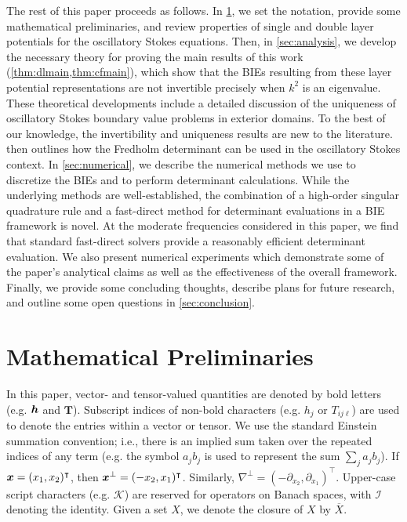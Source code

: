 The rest of this paper proceeds as follows.
%
In \cref{sec:prelim}, we set the notation, provide some
mathematical preliminaries, and review 
properties of single and double layer potentials
for the oscillatory Stokes equations.
%
Then, in \cref{sec:analysis}, we develop the necessary
theory for proving the main results of this work 
(\cref{thm:dlmain,thm:cfmain}),
which show that the BIEs resulting from these
layer potential representations are not invertible
precisely when $k^2$ is an eigenvalue.
%
These theoretical developments include a detailed
discussion of the uniqueness of oscillatory Stokes
boundary value problems in exterior domains.
%
To the best of our knowledge, the invertibility
and uniqueness results are new to the literature.
%
 then outlines how the Fredholm determinant
can be used in the oscillatory Stokes context.
%
In \cref{sec:numerical}, we describe the numerical
methods we use to discretize the BIEs and to perform
determinant calculations.
%
While the underlying methods are well-established,
the combination of a high-order singular quadrature
rule and a fast-direct method for determinant evaluations
in a BIE framework is novel.
%
At the moderate frequencies considered in this
paper, we find that standard fast-direct
solvers provide a reasonably efficient determinant
evaluation.
%
We also present numerical experiments
which demonstrate some of the paper's analytical
claims as well as the effectiveness of the overall
framework.
%
Finally, we provide some concluding thoughts,
describe plans for future research,
and outline some open questions in
\cref{sec:conclusion}.


%
\section{Mathematical Preliminaries}
\label{sec:prelim}
In this paper, vector- and tensor-valued quantities
are denoted by bold letters (e.g. ${\boldsymbol h}$ and $\mathbf{T}$). 
Subscript indices of non-bold characters (e.g. $h_j$ or $T_{ij\ell}$)
are used to denote the entries within a vector or tensor.
We use the standard Einstein summation convention; i.e., 
there is an implied sum taken over the repeated indices of 
any term (e.g. the symbol $a_{j} b_{j}$ is used to represent the sum
$\sum_{j} a_{j} b_{j}$).
If ${\boldsymbol x} = (x_1,x_2)^\intercal$, then ${\boldsymbol x}^\bot = (-x_2,x_1)^\intercal$.
Similarly, $\nabla^\bot = (-\partial_{x_2},\partial_{x_1})^\intercal$.
Upper-case script characters (e.g. $\mathcal{K}$) are reserved for
operators on Banach spaces, with $\mathcal{I}$ denoting the
identity. Given a set $X$, we denote the closure of $X$
by $\overline{X}$.

